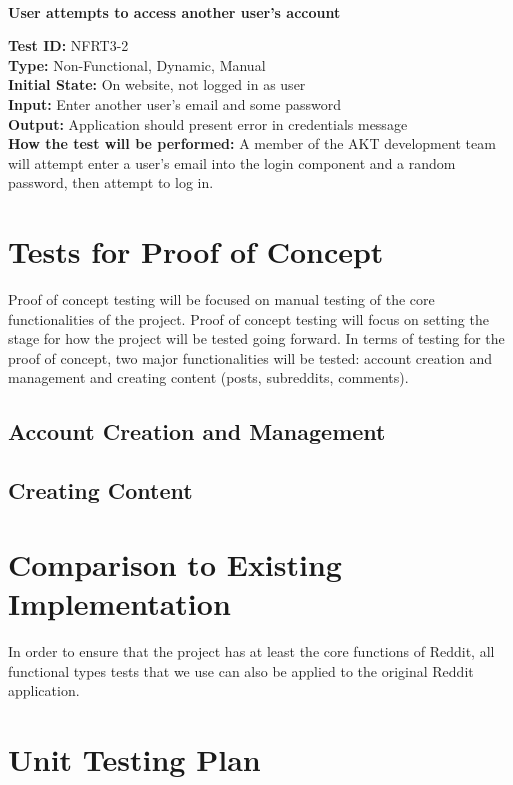\documentclass[12pt,fleqn]{article}
\begin{document}
\newpage

\textbf{\\User attempts to access another user's account}
\begin{tcolorbox}
\textbf{Test ID:} NFRT3-2\\
\textbf{Type:} Non-Functional, Dynamic, Manual\\
\textbf{Initial State:} On website, not logged in as user \\
\textbf{Input:} Enter another user's email and some password \\
\textbf{Output:} Application should present error in credentials message\\
\textbf{How the test will be performed:} A member of the AKT development team will attempt enter a user's email into the login component and a random password, then attempt to log in.
\end{tcolorbox}

\section{Tests for Proof of Concept}
Proof of concept testing will be focused on manual testing of the core functionalities of the project.  Proof of concept testing will focus on setting the stage for how the project will be tested going forward.  In terms of testing for the proof of concept, two major functionalities will be tested: account creation and management and creating content (posts, subreddits, comments).

\subsection{Account Creation and Management}
\subsection{Creating Content}



\section{Comparison to Existing Implementation}
In order to ensure that the project has at least the core functions of Reddit, all functional types tests that we use can also be applied to the original Reddit application.

\section{Unit Testing Plan}
\end{document}

